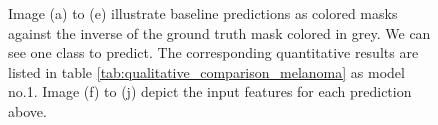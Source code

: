 \begin{figure}[H]
  \caption[Quantitative baseline analysis for the \ac{SLD}]{Image (a) to (e) illustrate baseline predictions as colored masks against the inverse of the ground truth mask colored in grey. We can see one class to predict. The corresponding quantitative results are listed in table \ref{tab:qualitative_comparison_melanoma} as model no.1. Image (f) to (j) depict the input features for each prediction above.}
  \label{ce_melanoma_baseV2}
\end{figure}
